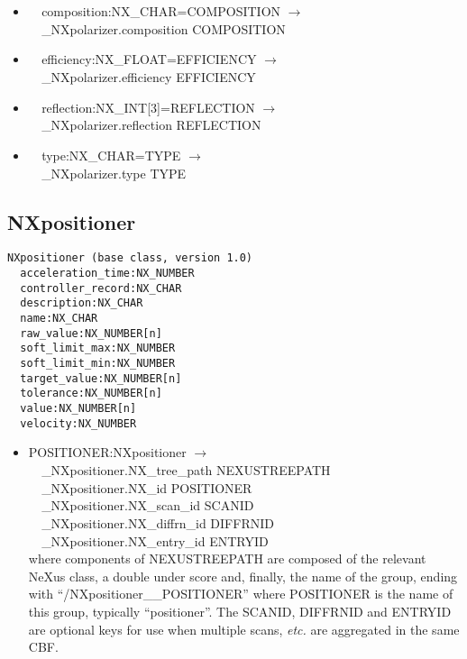 \documentclass[11pt]{article}
\begin{document}
{{\begin{itemize}
\item{\verb|  |composition:NX\_CHAR=COMPOSITION $\rightarrow$\\
\verb|  |\_NXpolarizer.composition COMPOSITION}

\item{\verb|  |efficiency:NX\_FLOAT=EFFICIENCY $\rightarrow$\\
\verb|  |\_NXpolarizer.efficiency EFFICIENCY}

\item{\verb|  |reflection:NX\_INT[3]=REFLECTION $\rightarrow$\\
\verb|  |\_NXpolarizer.reflection REFLECTION}

\item{\verb|  |type:NX\_CHAR=TYPE $\rightarrow$\\
\verb|  |\_NXpolarizer.type TYPE}
\end{itemize}
\subsection{NXpositioner}

\begin{verbatim}
NXpositioner (base class, version 1.0)
  acceleration_time:NX_NUMBER
  controller_record:NX_CHAR
  description:NX_CHAR
  name:NX_CHAR
  raw_value:NX_NUMBER[n]
  soft_limit_max:NX_NUMBER
  soft_limit_min:NX_NUMBER
  target_value:NX_NUMBER[n]
  tolerance:NX_NUMBER[n]
  value:NX_NUMBER[n]
  velocity:NX_NUMBER
\end{verbatim}

\begin{itemize}

\item{POSITIONER:NXpositioner $\rightarrow$\\
\verb|  |\_NXpositioner.NX\_tree\_path    NEXUSTREEPATH \\
\verb|  |\_NXpositioner.NX\_id            POSITIONER\\
\verb|  |\_NXpositioner.NX\_scan\_id      SCANID \\
\verb|  |\_NXpositioner.NX\_diffrn\_id    DIFFRNID \\
\verb|  |\_NXpositioner.NX\_entry\_id     ENTRYID \\
where components of NEXUSTREEPATH are composed of the
relevant NeXus class, a double under score and, finally, the
name of the group, ending with ``/NXpositioner\_\_POSITIONER''
where POSITIONER is the name of this group, typically ``positioner''.
The SCANID, DIFFRNID and ENTRYID are optional keys for use
when multiple scans, {\it etc.} are aggregated in the same CBF.}


\end{itemize}}}
\end{document}
